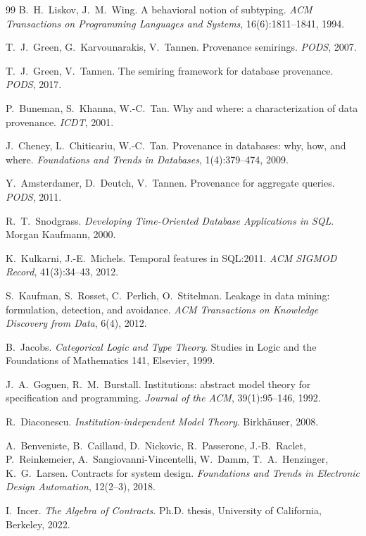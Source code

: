 \documentclass[11pt,a4paper]{article}
\renewcommand{\_}{\oldunderscore\allowbreak}
\theoremstyle{plain}
\theoremstyle{definition}
\theoremstyle{definition}
\theoremstyle{remark}
\begin{document}
\begin{thebibliography}{99}
 B.~H.~Liskov, J.~M.~Wing. A behavioral notion of subtyping. \emph{ACM Transactions on
Programming Languages and Systems}, 16(6):1811--1841, 1994.

 T.~J.~Green, G.~Karvounarakis, V.~Tannen. Provenance semirings. \emph{PODS}, 2007.

 T.~J.~Green, V.~Tannen. The semiring framework for database provenance.
\emph{PODS}, 2017.

 P.~Buneman, S.~Khanna, W.-C.~Tan. Why and where: a characterization of data
provenance. \emph{ICDT}, 2001.

 J.~Cheney, L.~Chiticariu, W.-C.~Tan. Provenance in databases: why, how, and where.
\emph{Foundations and Trends in Databases}, 1(4):379--474, 2009.

 Y.~Amsterdamer, D.~Deutch, V.~Tannen. Provenance for aggregate queries.
\emph{PODS}, 2011.

 R.~T.~Snodgrass. \emph{Developing Time-Oriented Database Applications in SQL}.
Morgan Kaufmann, 2000.

 K.~Kulkarni, J.-E.~Michels. Temporal features in SQL:2011. \emph{ACM SIGMOD Record},
41(3):34--43, 2012.

 S.~Kaufman, S.~Rosset, C.~Perlich, O.~Stitelman. Leakage in data mining: formulation,
detection, and avoidance. \emph{ACM Transactions on Knowledge Discovery from Data}, 6(4), 2012.

 B.~Jacobs. \emph{Categorical Logic and Type Theory}. Studies in Logic and the
Foundations of Mathematics 141, Elsevier, 1999.

 J.~A.~Goguen, R.~M.~Burstall. Institutions: abstract model theory for specification and
programming. \emph{Journal of the ACM}, 39(1):95--146, 1992.

 R.~Diaconescu. \emph{Institution-independent Model Theory}. Birkh\"auser, 2008.

 A.~Benveniste, B.~Caillaud, D.~Nickovic, R.~Passerone, J.-B.~Raclet,
P.~Reinkemeier, A.~Sangiovanni-Vincentelli, W.~Damm, T.~A.~Henzinger, K.~G.~Larsen. Contracts for
system design. \emph{Foundations and Trends in Electronic Design Automation}, 12(2--3), 2018.

 I.~Incer. \emph{The Algebra of Contracts}. Ph.D. thesis, University of California,
Berkeley, 2022.


\end{thebibliography}
\end{document}
